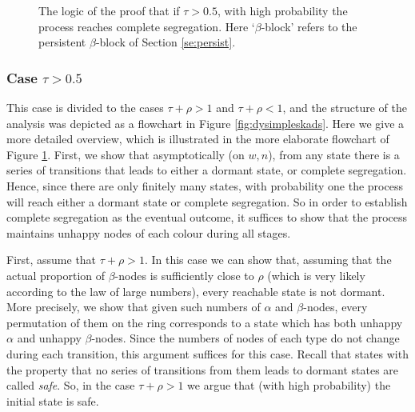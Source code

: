 \documentclass[11pt]{article}
\theoremstyle{plain}
\numberwithin{equation}{subsection}
\begin{document}
\begin{figure}
{}
\centering
\caption{The logic of the proof that if $\tau>0.5$, with high probability the process reaches complete segregation. Here `$\beta$-block'
refers to the persistent $\beta$-block of Section \ref{se:persist}.}
\label{fig:dyprogeneralskads}
\end{figure}

\subsubsection*{{\bf Case} \texorpdfstring {$\tau>0.5$}{Hard case}}
This case is divided to the cases $\tau+\rho>1$ and $\tau+\rho<1$, and the
structure of the analysis was depicted as a flowchart in Figure \ref{fig:dysimpleskads}.
Here we give a more detailed overview, which is illustrated in the more elaborate flowchart of Figure
\ref{fig:dyprogeneralskads}.
First, we show that asymptotically (on $w,n$), from any state
there is a series of transitions
that leads to either a dormant state, or complete segregation.
Hence, since there are only finitely many states, with probability one
the process will reach either a dormant state or complete segregation.
So in order to establish complete segregation as the eventual outcome, it suffices to show
that the process maintains unhappy nodes of each colour during all stages.

First, assume that $\tau+\rho>1$. In this case we can show that, assuming that the 
actual proportion of $\beta$-nodes is
sufficiently close to $\rho$ (which is very likely according to the law of large numbers),
every reachable state is not dormant. More precisely, we show that
given such numbers of $\alpha$ and $\beta$-nodes, every permutation of them on
the ring corresponds to a state which has both unhappy $\alpha$ and unhappy $\beta$-nodes.
Since the numbers of nodes of each type do not change during each transition, this argument
suffices for this case. Recall that states with the property that no series of transitions from them leads to
dormant states are called {\em safe}. So, in the case
$\tau+\rho>1$ we argue that (with high probability) the initial state is safe.
\end{document}
